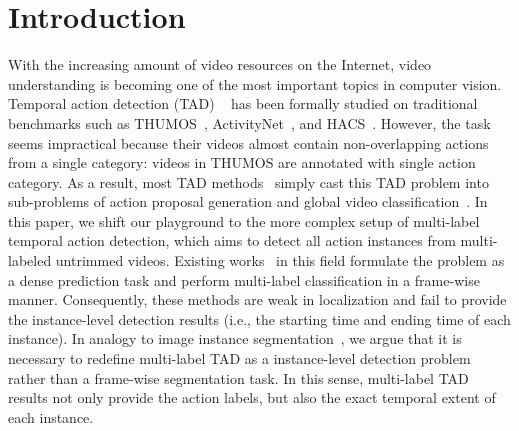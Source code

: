 \documentclass{article}
\begin{document}
\section{Introduction}
With the increasing amount of video resources on the Internet, video understanding is becoming one of the most important topics in computer vision. Temporal action detection (TAD) ~\cite{DBLP:journals/ijcv/ZhaoXWWTL20,DBLP:conf/eccv/LinZSWY18, DBLP:conf/iccv/LinLLDW19, DBLP:conf/cvpr/ChaoVSRDS18, DBLP:conf/aaai/GaoSWLYGZ20, DBLP:conf/cvpr/Lin0LWTWLHF21, DBLP:conf/iccv/TanT0W21} has been formally studied on traditional benchmarks such as THUMOS~\cite{DBLP:journals/cviu/IdreesZJGLSS17}, ActivityNet~\cite{DBLP:conf/cvpr/HeilbronEGN15}, and HACS~\cite{DBLP:conf/iccv/Zhao0TY19}. 
However, the task seems impractical because their videos almost contain non-overlapping actions from a single category:  videos in THUMOS are annotated with single action category. As a result, most TAD methods~\cite{DBLP:conf/eccv/LinZSWY18,DBLP:conf/iccv/LinLLDW19,DBLP:conf/cvpr/XuZRTG20,DBLP:journals/corr/abs-2112-03612,DBLP:conf/aaai/SuGWQY21} simply cast this TAD problem into sub-problems of action proposal generation and global video classification~\cite{DBLP:conf/cvpr/WangXLG17}.
In this paper, we shift our playground to the more complex setup of multi-label temporal action detection, which aims to detect all action instances from multi-labeled untrimmed videos. Existing works~\cite{DBLP:conf/wacv/DaiDMGFB21,DBLP:conf/cvpr/KahatapitiyaR21,DBLP:conf/cvpr/TirupatturDRS21,DBLP:conf/cvpr/DaiDKRB22} in this field formulate the problem as a dense prediction task and perform multi-label classification in a frame-wise manner. 
Consequently, these methods are weak in localization and fail to provide the instance-level detection results (i.e., the starting time and ending time of each instance).
In analogy to image instance segmentation~\cite{DBLP:conf/eccv/LinMBHPRDZ14}, we argue that it is necessary to redefine multi-label TAD as a instance-level detection problem rather than a frame-wise segmentation task.
In this sense, multi-label TAD results not only provide the action labels, but also the exact temporal extent of each instance.
\end{document}
